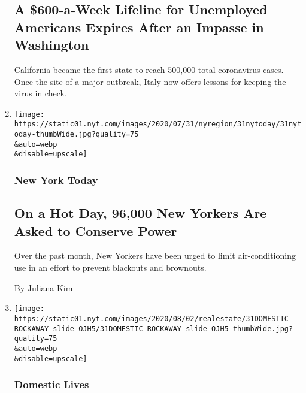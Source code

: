 \begin{enumerate}
  \hypertarget{a-600-a-week-lifeline-for-unemployed-americans-expires-after-an-impasse-in-washington}{%
  \subsection{A \$600-a-Week Lifeline for Unemployed Americans Expires
  After an Impasse in
  Washington}\label{a-600-a-week-lifeline-for-unemployed-americans-expires-after-an-impasse-in-washington}}

  California became the first state to reach 500,000 total coronavirus
  cases. Once the site of a major outbreak, Italy now offers lessons for
  keeping the virus in check.
\item
  \href{/2020/07/31/nyregion/nyc-power-con-edison.html}{}

  \texttt{[image: https://static01.nyt.com/images/2020/07/31/nyregion/31nytoday/31nytoday-thumbWide.jpg?quality=75\\\&auto=webp\\\&disable=upscale]}

  \hypertarget{new-york-today}{%
  \subsubsection{New York Today}\label{new-york-today}}

  \hypertarget{on-a-hot-day-96000-new-yorkers-are-asked-to-conserve-power}{%
  \subsection{On a Hot Day, 96,000 New Yorkers Are Asked to Conserve
  Power}\label{on-a-hot-day-96000-new-yorkers-are-asked-to-conserve-power}}

  Over the past month, New Yorkers have been urged to limit
  air-conditioning use in an effort to prevent blackouts and brownouts.~

  By Juliana Kim
\item
  \href{/2020/07/31/realestate/a-rockaway-beach-queens-life.html}{}

  \texttt{[image: https://static01.nyt.com/images/2020/08/02/realestate/31DOMESTIC-ROCKAWAY-slide-OJH5/31DOMESTIC-ROCKAWAY-slide-OJH5-thumbWide.jpg?quality=75\\\&auto=webp\\\&disable=upscale]}

  \hypertarget{domestic-lives}{%
  \subsubsection{Domestic Lives}\label{domestic-lives}}

  \hypertarget{a-rockaway-life}{%
}
\end{enumerate}
